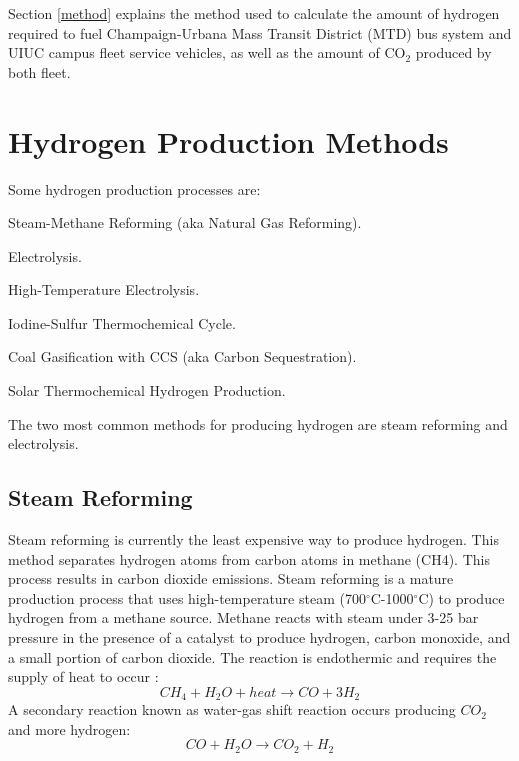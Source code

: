 \documentclass{anstrans}
\begin{document}
Section \ref{method} explains the method used to calculate the amount of hydrogen required to fuel Champaign-Urbana Mass Transit District (MTD) bus system and UIUC campus fleet service vehicles, as well as the amount of CO$_2$ produced by both fleet. 

\section{Hydrogen Production Methods}
\label{section:hydroprod}

Some hydrogen production processes are: 
\begin{description}[font=$\bullet$\scshape\bfseries]
	\item[] Steam-Methane Reforming (aka Natural Gas Reforming).
	\item[] Electrolysis.
	\item[] High-Temperature Electrolysis.
	\item[] Iodine-Sulfur Thermochemical Cycle.
	\item[] Coal Gasification with CCS (aka Carbon Sequestration).
	\item[] Solar Thermochemical Hydrogen Production.
\end{description}

The two most common methods for producing hydrogen are steam reforming and electrolysis.

\subsection{Steam Reforming}

Steam reforming is currently the least expensive way to produce hydrogen. This method separates hydrogen atoms from carbon atoms in methane (CH4). This process results in carbon dioxide emissions.
Steam reforming is a mature production process that uses high-temperature steam (700$^{\circ}$C-1000$^{\circ}$C) to produce hydrogen from a methane source. Methane reacts with steam under 3-25 bar pressure in the presence of a catalyst to produce hydrogen, carbon monoxide, and a small portion of carbon dioxide. The reaction is endothermic and requires the supply of heat to occur \cite{noauthor_hydrogen_nodate}:
\begin{equation}
CH_4 + H_2O + heat \rightarrow CO + 3H_2
\end{equation}
A secondary reaction known as water-gas shift reaction occurs producing $CO_2$ and more hydrogen:
\begin{equation}
CO + H_2O \rightarrow CO_2 + H_2
\end{equation}
\end{document}
